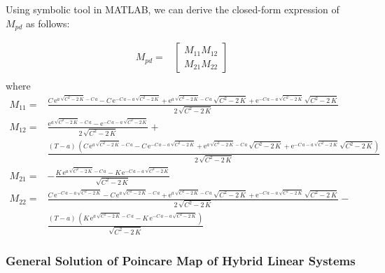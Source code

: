 \noindent Using symbolic tool in MATLAB, we can derive the closed-form expression of $M_{pd}$ as follows:

\begin{align*}
M_{pd} =& \begin{bmatrix}
M_{11} M_{12}  \\
M_{21} M_{22}
\end{bmatrix}\\
\end{align*}
where
\begin{align*}
M_{11} =& \frac{C\,{\mathrm{e}}^{a\,\sqrt{C^2-2\,K}-C\,a}-C\,{\mathrm{e}}^{-C\,a-a\,\sqrt{C^2-2\,K}}+{\mathrm{e}}^{a\,\sqrt{C^2-2\,K}-C\,a}\,\sqrt{C^2-2\,K}+{\mathrm{e}}^{-C\,a-a\,\sqrt{C^2-2\,K}}\,\sqrt{C^2-2\,K}}{2\,\sqrt{C^2-2\,K}}\\
M_{12} =& 
\frac{{\mathrm{e}}^{a\,\sqrt{C^2-2\,K}-C\,a}-{\mathrm{e}}^{-C\,a-a\,\sqrt{C^2-2\,K}}}{2\,\sqrt{C^2-2\,K}}+\\ &\frac{\left(T-a\right)\,\left(C\,{\mathrm{e}}^{a\,\sqrt{C^2-2\,K}-C\,a}-C\,{\mathrm{e}}^{-C\,a-a\,\sqrt{C^2-2\,K}}+{\mathrm{e}}^{a\,\sqrt{C^2-2\,K}-C\,a}\,\sqrt{C^2-2\,K}+{\mathrm{e}}^{-C\,a-a\,\sqrt{C^2-2\,K}}\,\sqrt{C^2-2\,K}\right)}{2\,\sqrt{C^2-2\,K}}\\
M_{21} =& -\frac{K\,{\mathrm{e}}^{a\,\sqrt{C^2-2\,K}-C\,a}-K\,{\mathrm{e}}^{-C\,a-a\,\sqrt{C^2-2\,K}}}{\sqrt{C^2-2\,K}}\\
M_{22} =& \frac{C\,{\mathrm{e}}^{-C\,a-a\,\sqrt{C^2-2\,K}}-C\,{\mathrm{e}}^{a\,\sqrt{C^2-2\,K}-C\,a}+{\mathrm{e}}^{a\,\sqrt{C^2-2\,K}-C\,a}\,\sqrt{C^2-2\,K}+{\mathrm{e}}^{-C\,a-a\,\sqrt{C^2-2\,K}}\,\sqrt{C^2-2\,K}}{2\,\sqrt{C^2-2\,K}}-
\\ &\frac{\left(T-a\right)\,\left(K\,{\mathrm{e}}^{a\,\sqrt{C^2-2\,K}-C\,a}-K\,{\mathrm{e}}^{-C\,a-a\,\sqrt{C^2-2\,K}}\right)}{\sqrt{C^2-2\,K}}
\end{align*}


\pagebreak

\subsubsection{General Solution of Poincare Map of Hybrid Linear Systems}


